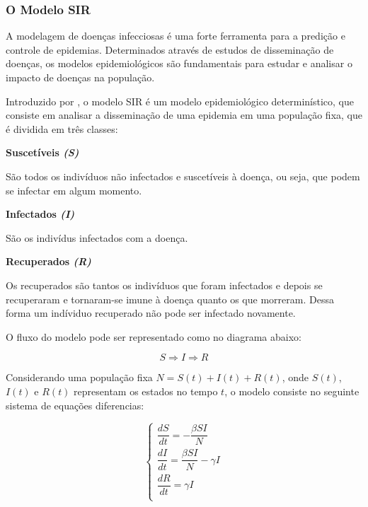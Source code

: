 \documentclass[a4paper,12pt]{article}
\begin{document}
\subsubsection{O Modelo SIR}

A modelagem de doenças infecciosas é uma forte ferramenta para a predição e controle de epidemias. Determinados através de estudos de 
disseminação de doenças, os modelos epidemiológicos são fundamentais para estudar e analisar o impacto de doenças na população.

Introduzido por \cite{kermack1927contribution}, o modelo SIR é um modelo epidemiológico determinístico, que consiste em analisar
a disseminação de uma epidemia em uma população fixa, que é dividida em três classes:

\begin{description}
 \item \textbf{Suscetíveis \textit{(S)}}
 
    São todos os indivíduos não infectados e suscetíveis à doença, ou seja, que podem se infectar em algum momento.
 \item \textbf{Infectados \textit{(I)}}
 
    São os indivídus infectados com a doença.
 \item \textbf{Recuperados \textit{(R)}}
 
    Os recuperados são tantos os indivíduos que foram infectados e depois se recuperaram e tornaram-se imune à doença quanto os que
    morreram. Dessa forma um indíviduo recuperado não pode ser infectado novamente.
\end{description}

\vspace{0.3cm}
O fluxo do modelo pode ser representado como no diagrama abaixo:

$$ S \Rightarrow I \Rightarrow R$$

\vspace{0.3cm}

Considerando uma população fixa $N = S(t) + I(t) + R(t)$, onde $S(t)$, $I(t)$ e $R(t)$ representam os estados no tempo $t$,
o modelo consiste no seguinte sistema de equações diferencias:

\vspace{0.3cm}
\begin{equation}
  \begin{cases}
    \dfrac{dS}{dt} = - \dfrac{\beta SI}{N} \\[0.5cm]
    \dfrac{dI}{dt} = \dfrac{\beta SI}{N} - \gamma I \\[0.5cm]
    \dfrac{dR}{dt} = \gamma I \\
  \end{cases}
\end{equation}
\end{document}
